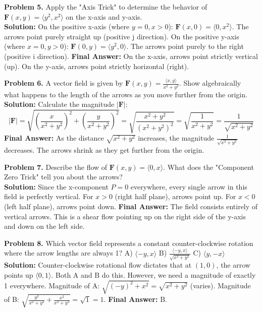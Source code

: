 \documentclass[11pt]{article}
\begin{document}
\vspace{0.3cm}
\textbf{Problem 5.} Apply the "Axis Trick" to determine the behavior of $\mathbf{F}(x,y) = \langle y^2, x^2 \rangle$ on the x-axis and y-axis. \\
\textbf{Solution:}
On the positive x-axis (where $y=0, x>0$): $\mathbf{F}(x, 0) = \langle 0, x^2 \rangle$. The arrows point purely straight up (positive j direction).
On the positive y-axis (where $x=0, y>0$): $\mathbf{F}(0, y) = \langle y^2, 0 \rangle$. The arrows point purely to the right (positive i direction).
\textbf{Final Answer:} On the x-axis, arrows point strictly vertical (up). On the y-axis, arrows point strictly horizontal (right).

\vspace{0.3cm}
\textbf{Problem 6.} A vector field is given by $\mathbf{F}(x, y) = \frac{\langle x, y \rangle}{x^2 + y^2}$. Show algebraically what happens to the length of the arrows as you move further from the origin. \\
\textbf{Solution:}
Calculate the magnitude $|\mathbf{F}|$:
$$|\mathbf{F}| = \sqrt{ \left(\frac{x}{x^2+y^2}\right)^2 + \left(\frac{y}{x^2+y^2}\right)^2 } = \sqrt{\frac{x^2 + y^2}{(x^2+y^2)^2}} = \sqrt{\frac{1}{x^2+y^2}} = \frac{1}{\sqrt{x^2+y^2}}$$
\textbf{Final Answer:} As the distance $\sqrt{x^2+y^2}$ increases, the magnitude $\frac{1}{\sqrt{x^2+y^2}}$ decreases. The arrows shrink as they get further from the origin.

\vspace{0.3cm}
\textbf{Problem 7.} Describe the flow of $\mathbf{F}(x,y) = \langle 0, x \rangle$. What does the "Component Zero Trick" tell you about the arrows? \\
\textbf{Solution:}
Since the x-component $P = 0$ everywhere, every single arrow in this field is perfectly vertical. For $x > 0$ (right half plane), arrows point up. For $x < 0$ (left half plane), arrows point down.
\textbf{Final Answer:} The field consists entirely of vertical arrows. This is a shear flow pointing up on the right side of the y-axis and down on the left side.

\vspace{0.3cm}
\textbf{Problem 8.} Which vector field represents a constant counter-clockwise rotation where the arrow lengths are always 1? 
A) $\langle -y, x \rangle$ \quad B) $\frac{\langle -y, x \rangle}{\sqrt{x^2+y^2}}$ \quad C) $\langle y, -x \rangle$ \\
\textbf{Solution:}
Counter-clockwise rotational flow dictates that at $(1,0)$, the arrow points up $\langle 0,1 \rangle$. Both A and B do this. However, we need a magnitude of exactly 1 everywhere.
Magnitude of A: $\sqrt{(-y)^2+x^2} = \sqrt{x^2+y^2}$ (varies).
Magnitude of B: $\sqrt{ \frac{y^2}{x^2+y^2} + \frac{x^2}{x^2+y^2} } = \sqrt{1} = 1$.
\textbf{Final Answer:} B.
\end{document}
